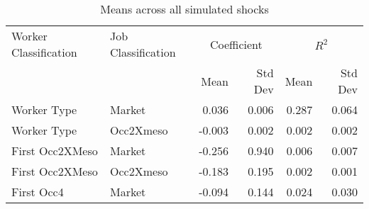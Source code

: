 \begin{table}
\centering
\caption{Means across all simulated shocks}
\label{table:all_sector_shocks_means}
\begin{tabular}{@{\extracolsep{10pt}}llrrrr}
\toprule
Worker Classification & Job Classification & \multicolumn{2}{c}{Coefficient} & \multicolumn{2}{c}{$R^2$} \\ \cline{3-4}\cline{5-6}
               \hfill &             \hfill &        Mean & Std Dev &   Mean & Std Dev \\
\midrule
          Worker Type &             Market &       0.036 &   0.006 &  0.287 &   0.064 \\
          Worker Type &          Occ2Xmeso &      -0.003 &   0.002 &  0.002 &   0.002 \\
      First Occ2XMeso &             Market &      -0.256 &   0.940 &  0.006 &   0.007 \\
      First Occ2XMeso &          Occ2Xmeso &      -0.183 &   0.195 &  0.002 &   0.001 \\
           First Occ4 &             Market &      -0.094 &   0.144 &  0.024 &   0.030 \\
\bottomrule
\end{tabular}
\end{table}
